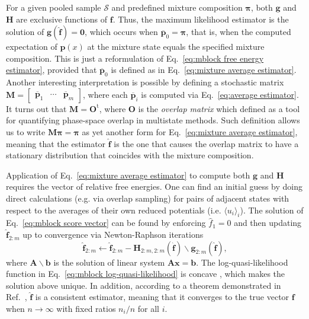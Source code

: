 \documentclass[journal=jctcce,manuscript=article,layout=twocolumn]{achemso}
\newcommand{\mt}[1]{\boldsymbol{\mathbf{#1}}}   %
\newcommand{\vt}[1]{\boldsymbol{\mathbf{#1}}}   %
\newcommand{\tr}[1]{#1^\text{t}}                %
\begin{document}
For a given pooled sample $\mathcal S$ and predefined mixture composition $\vt \pi$, both $\vt g$ and $\mt H$ are exclusive functions of $\vt f$. Thus, the maximum likelihood estimator is the solution of $\vt g(\hat{\vt f}) = \vt 0$, which occurs when $\overline{\vt p}_0 = \vt \pi$, that is, when the computed expectation of $\vt p(x)$ at the mixture state equals the specified mixture composition. This is just a reformulation of Eq.~\eqref{eq:mblock free energy estimator}, provided that $\overline{\vt p}_0$ is defined as in Eq.~\eqref{eq:mixture average estimator}. Another interesting interpretation is possible by defining a stochastic matrix $\mt M = [\begin{array}{ccc} \overline{\vt p}_1 & \cdots & \overline{\vt p}_m \end{array}]$, where each $\overline{\vt p}_i$ is computed via Eq.~\eqref{eq:average estimator}. It turns out that $\mt M = \tr{\mt O}$, where $\mt O$ is the \textit{overlap matrix} which \citeauthor{Klimovich_2015} \cite{Klimovich_2015} defined as a tool for quantifying phase-space overlap in multistate methods. Such definition allows us to write $\mt M \vt \pi = \vt \pi$ as yet another form for Eq.~\eqref{eq:mixture average estimator}, meaning that the estimator $\hat{\vt f}$ is the one that causes the overlap matrix to have a stationary distribution that coincides with the mixture composition.

Application of Eq.~\eqref{eq:mixture average estimator} to compute both $\vt g$ and $\mt H$ requires the vector of relative free energies. One can find an initial guess by doing direct calculations (e.g. via overlap sampling\cite{Lee_1980, Lu_2003}) for pairs of adjacent states with respect to the averages of their own reduced potentials (i.e. $\langle u_i \rangle_i$). The solution of Eq.~\eqref{eq:mblock score vector} can be found by enforcing $\hat f_1 = 0$ and then updating $\hat{\vt f}_{2:m}$ up to convergence via Newton-Raphson iterations \cite{Shirts_2008}
\begin{equation*}
\label{eq:mblock Newton-Raphson}
\hat{\vt f}_{2:m} \leftarrow \hat{\vt f}_{2:m} - {\mt H}_{2:m,2:m}(\hat{\vt f}) \backslash {\vt g}_{2:m}(\hat{\vt f}),
\end{equation*}
where $\mt A \backslash \vt b$ is the solution of linear system $\mt A \vt x = \vt b$. The log-quasi-likelihood function in Eq.~\eqref{eq:mblock log-quasi-likelihood} is concave \cite{Doss_2014}, which makes the solution above unique. In addition, according to a theorem demonstrated in Ref.~, $\hat{\vt f}$ is a consistent estimator, meaning that it converges to the true vector $\vt f$ when $n \rightarrow \infty$ with fixed ratios $n_i/n$ for all $i$.
\end{document}
